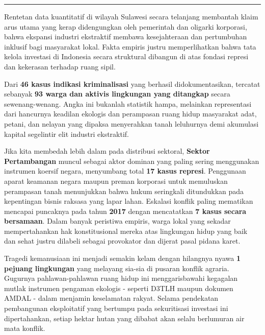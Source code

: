 \documentclass[
]{article}
\begin{document}
\begin{center}\rule{0.5\linewidth}{0.5pt}\end{center}

Rentetan data kuantitatif di wilayah Sulawesi secara telanjang membantah
klaim arus utama yang kerap didengungkan oleh pemerintah dan oligarki
korporasi, bahwa ekspansi industri ekstraktif membawa kesejahteraan dan
pertumbuhan inklusif bagi masyarakat lokal. Fakta empiris justru
memperlihatkan bahwa tata kelola investasi di Indonesia secara
struktural dibangun di atas fondasi represi dan kekerasan terhadap ruang
sipil.

Dari \textbf{46 kasus indikasi kriminalisasi} yang berhasil
didokumentasikan, tercatat sebanyak \textbf{93 warga dan aktivis
lingkungan yang ditangkap} secara sewenang-wenang. Angka ini bukanlah
statistik hampa, melainkan representasi dari hancurnya keadilan ekologis
dan perampasan ruang hidup masyarakat adat, petani, dan nelayan yang
dipaksa menyerahkan tanah leluhurnya demi akumulasi kapital segelintir
elit industri ekstraktif.

Jika kita membedah lebih dalam pada distribusi sektoral, \textbf{Sektor
Pertambangan} muncul sebagai aktor dominan yang paling sering
menggunakan instrumen koersif negara, menyumbang total \textbf{17 kasus
represi}. Penggunaan aparat keamanan negara maupun preman korporasi
untuk memuluskan perampasan tanah menunjukkan bahwa hukum seringkali
ditundukkan pada kepentingan bisnis raksasa yang lapar lahan. Eskalasi
konflik paling mematikan mencapai puncaknya pada tahun \textbf{2017}
dengan mencatatkan \textbf{7 kasus secara bersamaan}. Dalam banyak
peristiwa empiris, warga lokal yang sekadar mempertahankan hak
konstitusional mereka atas lingkungan hidup yang baik dan sehat justru
dilabeli sebagai provokator dan dijerat pasal pidana karet.

Tragedi kemanusiaan ini menjadi semakin kelam dengan hilangnya nyawa
\textbf{1 pejuang lingkungan} yang melayang sia-sia di pusaran konflik
agraria. Gugurnya pahlawan-pahlawan ruang hidup ini menggarisbawahi
kegagalan mutlak instrumen pengaman ekologis - seperti D3TLH maupun
dokumen AMDAL - dalam menjamin keselamatan rakyat. Selama pendekatan
pembangunan eksploitatif yang bertumpu pada sekuritisasi investasi ini
dipertahankan, setiap hektar hutan yang dibabat akan selalu berlumuran
air mata konflik.
\end{document}

